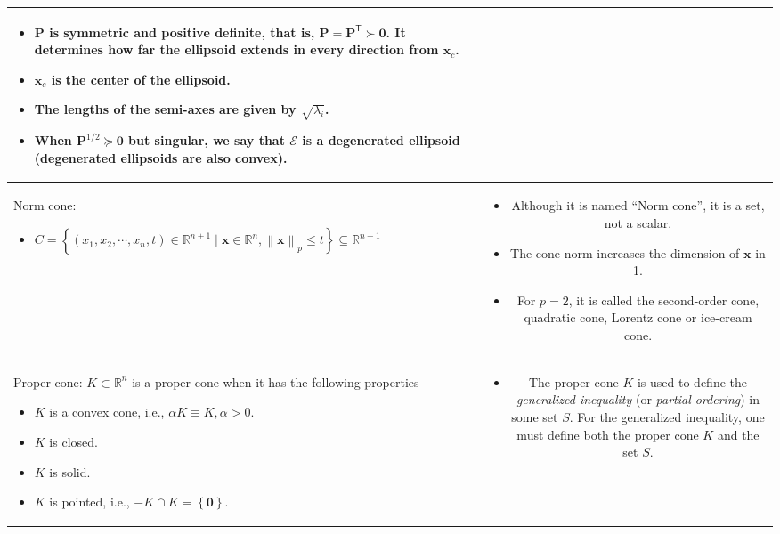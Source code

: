 \documentclass{article}
\newcommand{\trans}{\mathsf{T}}
\newcommand{\norm}[1]{\left\lVert#1\right\rVert}
\begin{document}
\begin{table}[ht!]
\begin{tabularx}{\textwidth}{|A|C|}
\begin{itemize}[leftmargin=*]
    \item \(\mathbf{P}\) is symmetric and positive definite, that is, \(\mathbf{P}=\mathbf{P}^\trans \succ \mathbf{0}\). It determines how far the ellipsoid extends in every direction from \(\mathbf{x}_c\).
    \item \(\mathbf{x}_{c}\) is the center of the ellipsoid.
    \item The lengths of the semi-axes are given by \(\sqrt{\lambda_i}\).
    \item When \(\mathbf{P}^{1/2} \succeq \mathbf{0}\) but singular, we say that \(\mathcal{E}\) is a degenerated ellipsoid (degenerated ellipsoids are also convex).
\end{itemize}\\
\hline
Norm cone:
\begin{itemize}[leftmargin=*]
    \item \(C = \left\{ (x_1, x_2, \cdots, x_n, t) \in \mathbb{R}^{n+1} \mid \mathbf{x} \in \mathbb{R}^{n}, \norm{\mathbf{x}}_{p} \leq t \right\} \subseteq \mathbb{R}^{n+1}\)
\end{itemize} & \vspace{-3.5ex}
\begin{itemize}[leftmargin=*]
    \item Although it is named ``Norm cone'', it is a set, not a scalar.
    \item The cone norm increases the dimension of \(\mathbf{x}\) in 1.
    \item For \(p=2\), it is called the second-order cone, quadratic cone,  Lorentz cone or ice-cream cone.
\end{itemize} \\
\hline
Proper cone: \(K \subset \mathbb{R}^{n}\) is a proper cone when it has the following properties
\begin{itemize}
    \item \(K\) is a convex cone, i.e., \(\alpha K \equiv K, \alpha > 0\).
    \item \(K\) is closed.
    \item \(K\) is solid.
    \item \(K\) is pointed, i.e., \(-K \cap K = \left\{ \mathbf{0} \right\}\).
\end{itemize} & \vspace{-3.5ex} \begin{itemize}[leftmargin=*]
    \item The proper cone \(K\) is used to define the \emph{generalized inequality} (or \emph{partial ordering}) in some set \(S\). For the generalized inequality, one must define both the proper cone \(K\) and the set \(S\).

\end{itemize}
\end{tabularx}
\end{table}
\end{document}
